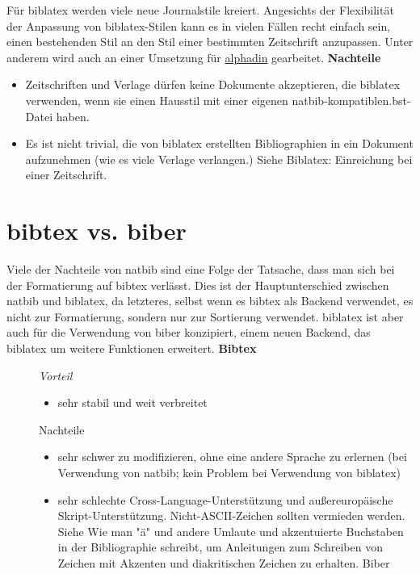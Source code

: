 Für biblatex werden viele neue Journalstile kreiert. Angesichts der Flexibilität der Anpassung von biblatex-Stilen kann es in vielen Fällen recht einfach sein, einen bestehenden Stil an den Stil einer bestimmten Zeitschrift anzupassen. Unter anderem wird auch an einer Umsetzung für \href{https://tex.stackexchange.com/questions/124473/is-there-a-biblatex-equivalent-for-the-bibtex-style-alphadin-for-the-din-1505}{alphadin} gearbeitet.
\newline
\textbf{Nachteile}

\begin{itemize}
	\item Zeitschriften und Verlage dürfen keine Dokumente akzeptieren, die biblatex verwenden, wenn sie einen Hausstil mit einer eigenen natbib-kompatiblen.bst-Datei haben.
	\item Es ist nicht trivial, die von biblatex erstellten Bibliographien in ein Dokument aufzunehmen (wie es viele Verlage verlangen.) Siehe Biblatex: Einreichung bei einer Zeitschrift.	
\end{itemize}

\section{bibtex vs. biber}
Viele der Nachteile von natbib sind eine Folge der Tatsache, dass man sich bei der Formatierung auf bibtex verlässt. Dies ist der Hauptunterschied zwischen natbib und biblatex, da letzteres, selbst wenn es bibtex als Backend verwendet, es nicht zur Formatierung, sondern nur zur Sortierung verwendet. biblatex ist aber auch für die Verwendung von biber konzipiert, einem neuen Backend, das biblatex um weitere Funktionen erweitert.
\bigskip
\textbf{Bibtex}

\begin{description}
	\item[] \emph{Vorteil}
	\begin{itemize}
		\item sehr stabil und weit verbreitet
	\end{itemize}
	\item[] Nachteile
	\begin{itemize}
		\item sehr schwer zu modifizieren, ohne eine andere Sprache zu erlernen (bei Verwendung von natbib; kein Problem bei Verwendung von biblatex)
		\item sehr schlechte Cross-Language-Unterstützung und außereuropäische Skript-Unterstützung. Nicht-ASCII-Zeichen sollten vermieden werden. Siehe Wie man "ä" und andere Umlaute und akzentuierte Buchstaben in der Bibliographie schreibt, um Anleitungen zum Schreiben von Zeichen mit Akzenten und diakritischen Zeichen zu erhalten.
		Biber
	\end{itemize}
\end{description}

